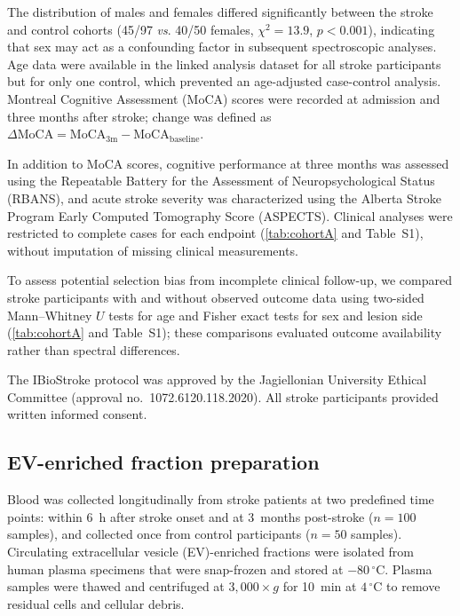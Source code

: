 \documentclass[preprint,12pt]{elsarticle}
\begin{document}
The distribution of males and females differed significantly between the stroke and control cohorts (45/97 \textit{vs}. 40/50 females, $\chi^2 = 13.9$, $p < 0.001$), indicating that sex may act as a confounding factor in subsequent spectroscopic analyses. Age data were available in the linked analysis dataset for all stroke participants but for only one control, which prevented an age-adjusted case-control analysis. Montreal Cognitive Assessment (MoCA) scores were recorded at admission and three months after stroke; change was defined as $\Delta\mathrm{MoCA}=\mathrm{MoCA}_{3\mathrm{m}}- \mathrm{MoCA}_{\mathrm{baseline}}$.

In addition to MoCA scores, cognitive performance at three months was assessed using the Repeatable Battery for the Assessment of Neuropsychological Status (RBANS), and acute stroke severity was characterized using the Alberta Stroke Program Early Computed Tomography Score (ASPECTS). Clinical analyses were restricted to complete cases for each endpoint (\cref{tab:cohortA} and Table~S1), without imputation of missing clinical measurements.

To assess potential selection bias from incomplete clinical follow-up, we compared stroke participants with and without observed outcome data using two-sided Mann--Whitney $U$ tests for age and Fisher exact tests for sex and lesion side (\cref{tab:cohortA} and Table~S1); these comparisons evaluated outcome availability rather than spectral differences.



The IBioStroke protocol was approved by the Jagiellonian University Ethical Committee (approval no.\ 1072.6120.118.2020). All stroke participants provided written informed consent.

\subsection{EV-enriched fraction preparation} 
\label{subsec:ev_isolation}

Blood was collected longitudinally from stroke patients at two predefined time points: within 6~h after stroke onset and at 3~months post-stroke ($n = 100$ samples), and collected once from control participants ($n = 50$ samples). Circulating extracellular vesicle (EV)-enriched fractions were isolated from human plasma specimens that were snap-frozen and stored at $-80\,^\circ\text{C}$. Plasma samples were thawed and centrifuged at $3{,}000 \times g$ for 10~min at $4\,^\circ\text{C}$ to remove residual cells and cellular debris.
\end{document}
